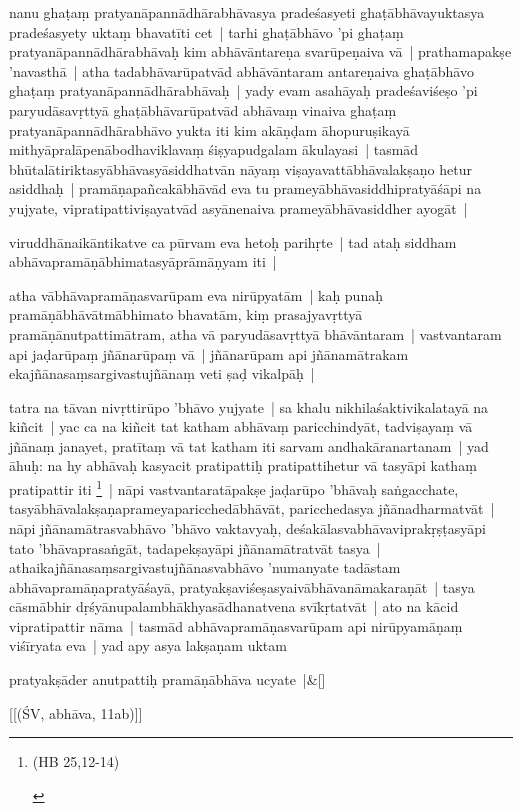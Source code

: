 \documentclass[article,12pt,a4paper]{memoir}
\begin{document}
	  \pstart nanu ghaṭaṃ pratyanāpannādhārabhāvasya pradeśasyeti ghaṭābhāvayuktasya pradeśasyety uktaṃ bhavatīti cet | tarhi ghaṭābhāvo 'pi ghaṭaṃ pratyanāpannādhārabhāvaḥ kim abhāvāntareṇa svarūpeṇaiva vā | prathamapakṣe 'navasthā | atha tadabhāvarūpatvād abhāvāntaram antareṇaiva ghaṭābhāvo ghaṭaṃ pratyanāpannādhārabhāvaḥ | yady evam asahāyaḥ pradeśaviśeṣo 'pi paryudāsavṛttyā ghaṭābhāvarūpatvād abhāvaṃ vinaiva ghaṭaṃ pratyanāpannādhārabhāvo yukta iti kim akāṇḍam āhopuruṣikayā mithyāpralāpenābodhaviklavaṃ śiṣyapudgalam ākulayasi | tasmād bhūtalātiriktasyābhāvasyāsiddhatvān nāyaṃ viṣayavattābhāvalakṣaṇo hetur asiddhaḥ | pramāṇapañcakābhāvād eva tu prameyābhāvasiddhipratyāśāpi na yujyate, vipratipattiviṣayatvād asyānenaiva prameyābhāvasiddher ayogāt |
	\pend
      

	  \pstart viruddhānaikāntikatve ca pūrvam eva hetoḥ parihṛte | tad ataḥ siddham abhāvapramāṇābhimatasyāprāmāṇyam iti |
	\pend
      

	  \pstart atha vābhāvapramāṇasvarūpam eva nirūpyatām | kaḥ punaḥ pramāṇābhāvātmābhimato bhavatām, kiṃ prasajyavṛttyā pramāṇānutpattimātram, atha vā paryudāsavṛttyā bhāvāntaram | vastvantaram api jaḍarūpaṃ jñānarūpaṃ vā | jñānarūpam api jñānamātrakam ekajñānasaṃsargivastujñānaṃ veti ṣaḍ vikalpāḥ |
	\pend
      

	  \pstart tatra na tāvan nivṛttirūpo 'bhāvo yujyate | sa khalu nikhilaśaktivikalatayā na kiñcit | yac ca na kiñcit tat katham abhāvaṃ paricchindyāt, tadviṣayaṃ vā jñānaṃ janayet, pratītaṃ vā tat katham iti sarvam andhakāranartanam | yad āhuḥ: na hy abhāvaḥ kasyacit pratipattiḥ pratipattihetur vā tasyāpi kathaṃ pratipattir iti \footnote{\begin{english}(HB 25,12-14)\end{english}} | nāpi vastvantaratāpakṣe jaḍarūpo 'bhāvaḥ saṅgacchate, tasyābhāvalakṣaṇaprameyaparicchedābhāvāt, paricchedasya jñānadharmatvāt | nāpi jñānamātrasvabhāvo 'bhāvo vaktavyaḥ, deśakālasvabhāvaviprakṛṣṭasyāpi tato 'bhāvaprasaṅgāt, tadapekṣayāpi jñānamātratvāt tasya | athaikajñānasaṃsargivastujñānasvabhāvo 'numanyate tadāstam abhāvapramāṇapratyāśayā, pratyakṣaviśeṣasyaivābhāvanāmakaraṇāt | tasya cāsmābhir dṛśyānupalambhākhyasādhanatvena svīkṛtatvāt | ato na kācid vipratipattir nāma | tasmād abhāvapramāṇasvarūpam api nirūpyamāṇaṃ viśīryata eva | yad apy asya lakṣaṇam uktam
	\pend
      
	    
	    \stanza[\smallbreak]
	pratyakṣāder anutpattiḥ pramāṇābhāva ucyate |\&[\smallbreak]


	[[(ŚV, abhāva, 11ab)]]
\end{document}
